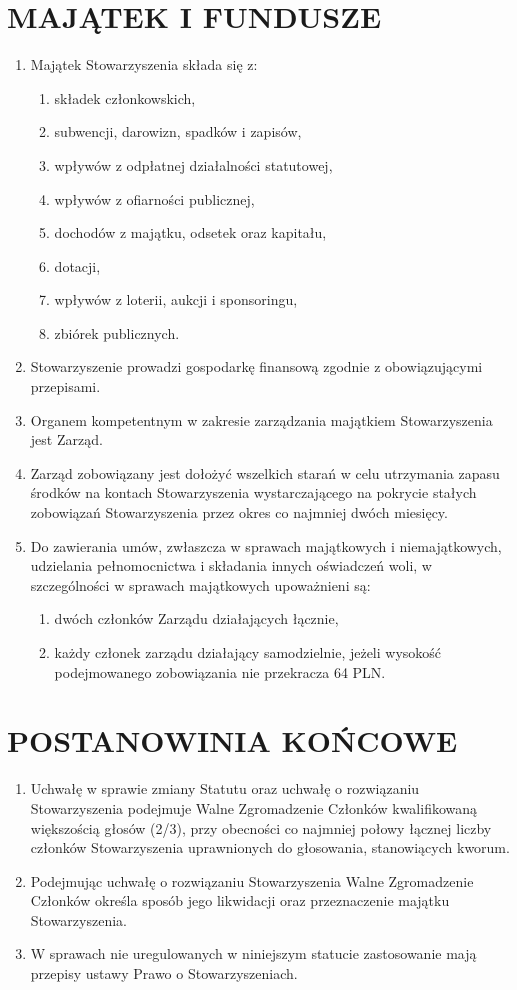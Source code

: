 \documentclass{article}
\begin{document}
\section{MAJĄTEK I FUNDUSZE}
  \begin{enumerate}
    \item Majątek Stowarzyszenia składa się z:
      \begin{enumerate}
        \item składek członkowskich,
        \item subwencji, darowizn, spadków i zapisów,
        \item wpływów z odpłatnej działalności statutowej,
        \item wpływów z ofiarności publicznej,
        \item dochodów z majątku, odsetek oraz kapitału,
        \item dotacji,
        \item wpływów z loterii, aukcji i sponsoringu,
        \item zbiórek publicznych.
      \end{enumerate}
    \item Stowarzyszenie prowadzi gospodarkę finansową zgodnie z obowiązującymi przepisami.
    \item Organem kompetentnym w zakresie zarządzania majątkiem Stowarzyszenia jest Zarząd.
    \item Zarząd zobowiązany jest dołożyć wszelkich starań w celu utrzymania zapasu środków na kontach Stowarzyszenia wystarczającego na pokrycie stałych zobowiązań Stowarzyszenia przez okres co najmniej dwóch miesięcy.
    \item Do zawierania umów, zwłaszcza w sprawach majątkowych i niemajątkowych, udzielania pełnomocnictwa i składania innych oświadczeń woli, w szczególności w sprawach majątkowych upoważnieni są:
      \begin{enumerate}
        \item dwóch członków Zarządu działających łącznie,
        \item każdy członek zarządu działający samodzielnie, jeżeli wysokość podejmowanego zobowiązania nie przekracza 64 PLN.
      \end{enumerate}
  \end{enumerate}
\section{POSTANOWINIA KOŃCOWE}
  \begin{enumerate}
    \item Uchwałę w sprawie zmiany Statutu oraz uchwałę o rozwiązaniu Stowarzyszenia podejmuje Walne Zgromadzenie Członków kwalifikowaną większością głosów (2/3), przy obecności co najmniej połowy łącznej liczby członków Stowarzyszenia uprawnionych do głosowania, stanowiących kworum.
    \item Podejmując uchwałę o rozwiązaniu Stowarzyszenia Walne Zgromadzenie Członków określa sposób jego likwidacji oraz przeznaczenie majątku Stowarzyszenia.
    \item W sprawach nie uregulowanych w niniejszym statucie zastosowanie mają przepisy ustawy Prawo o Stowarzyszeniach.
  \end{enumerate}
\end{document}
